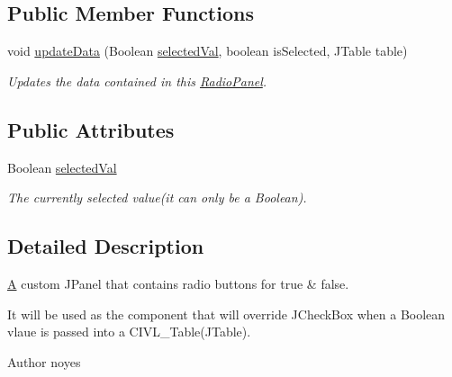 \subsection*{Public Member Functions}
\begin{DoxyCompactItemize}
\item 
void \hyperlink{classedu_1_1udel_1_1cis_1_1vsl_1_1civl_1_1gui_1_1common_1_1RadioPanel_ae18f2d6ffb84de5a36f1bac16e88d998}{update\+Data} (Boolean \hyperlink{classedu_1_1udel_1_1cis_1_1vsl_1_1civl_1_1gui_1_1common_1_1RadioPanel_a3ce77c469005c55141c01ad4964b3eed}{selected\+Val}, boolean is\+Selected, J\+Table table)
\begin{DoxyCompactList}\small\item\em Updates the data contained in this {\ttfamily \hyperlink{classedu_1_1udel_1_1cis_1_1vsl_1_1civl_1_1gui_1_1common_1_1RadioPanel}{Radio\+Panel}}. \end{DoxyCompactList}\end{DoxyCompactItemize}
\subsection*{Public Attributes}
\begin{DoxyCompactItemize}
\item 
\hypertarget{classedu_1_1udel_1_1cis_1_1vsl_1_1civl_1_1gui_1_1common_1_1RadioPanel_a3ce77c469005c55141c01ad4964b3eed}{}Boolean \hyperlink{classedu_1_1udel_1_1cis_1_1vsl_1_1civl_1_1gui_1_1common_1_1RadioPanel_a3ce77c469005c55141c01ad4964b3eed}{selected\+Val}\label{classedu_1_1udel_1_1cis_1_1vsl_1_1civl_1_1gui_1_1common_1_1RadioPanel_a3ce77c469005c55141c01ad4964b3eed}

\begin{DoxyCompactList}\small\item\em The currently selected value(it can only be a Boolean). \end{DoxyCompactList}\end{DoxyCompactItemize}


\subsection{Detailed Description}
\hyperlink{structA}{A} custom J\+Panel that contains radio buttons for true \& false. 

It will be used as the component that will override J\+Check\+Box when a Boolean vlaue is passed into a C\+I\+V\+L\+\_\+\+Table(\+J\+Table).

\begin{DoxyAuthor}{Author}
noyes 
\end{DoxyAuthor}


